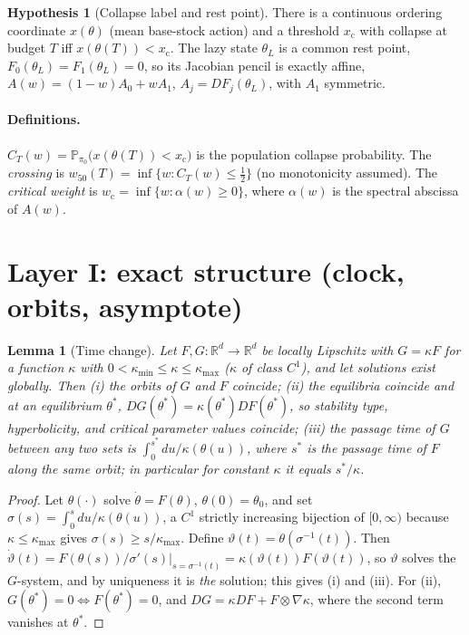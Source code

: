 \documentclass[11pt]{article}
\newtheorem{lemma}{Lemma}
\theoremstyle{definition}
\newtheorem{hyp}{Hypothesis}
\theoremstyle{remark}
\newcommand{\R}{\mathbb{R}}
\renewcommand{\P}{\mathbb{P}}
\newcommand{\wcrit}{w_{\mathrm c}}
\newcommand{\wfifty}{w_{50}}
\newcommand{\xc}{x_{\mathrm c}}
\begin{document}
\begin{hyp}[Collapse label and rest point]\label{h4}
There is a continuous ordering coordinate $x(\theta)$ (mean base-stock action) and a threshold $\xc$ with collapse at budget $T$ iff $x(\theta(T))<\xc$. The lazy state $\theta_L$ is a common rest point, $F_0(\theta_L)=F_1(\theta_L)=0$, so its Jacobian pencil is exactly affine, $A(w)=(1-w)A_0+wA_1$, $A_j=DF_j(\theta_L)$, with $A_1$ symmetric.
\end{hyp}

\paragraph{Definitions.} $C_T(w)=\P_{\pi_0}\big(x(\theta(T))<\xc\big)$ is the population collapse probability. The \emph{crossing} is $\wfifty(T)=\inf\{w:C_T(w)\le\tfrac12\}$ (no monotonicity assumed). The \emph{critical weight} is $\wcrit=\inf\{w:\alpha(w)\ge0\}$, where $\alpha(w)$ is the spectral abscissa of $A(w)$.

\section{Layer I: exact structure (clock, orbits, asymptote)}

\begin{lemma}[Time change]\label{l2}
Let $F,G:\R^d\to\R^d$ be locally Lipschitz with $G=\kappa F$ for a function $\kappa$ with $0<\kappa_{\min}\le\kappa\le\kappa_{\max}$ ($\kappa$ of class $C^1$), and let solutions exist globally. Then (i) the orbits of $G$ and $F$ coincide; (ii) the equilibria coincide and at an equilibrium $\theta^*$, $DG(\theta^*)=\kappa(\theta^*)DF(\theta^*)$, so stability type, hyperbolicity, and critical parameter values coincide; (iii) the passage time of $G$ between any two sets is $\int_0^{s^*}du/\kappa(\theta(u))$, where $s^*$ is the passage time of $F$ along the same orbit; in particular for constant $\kappa$ it equals $s^*/\kappa$.
\end{lemma}
\begin{proof}
Let $\theta(\cdot)$ solve $\dot\theta=F(\theta)$, $\theta(0)=\theta_0$, and set $\sigma(s)=\int_0^s du/\kappa(\theta(u))$, a $C^1$ strictly increasing bijection of $[0,\infty)$ because $\kappa\le\kappa_{\max}$ gives $\sigma(s)\ge s/\kappa_{\max}$. Define $\vartheta(t)=\theta(\sigma^{-1}(t))$. Then $\dot\vartheta(t)=F(\theta(s))/\sigma'(s)\big|_{s=\sigma^{-1}(t)}=\kappa(\vartheta(t))F(\vartheta(t))$, so $\vartheta$ solves the $G$-system, and by uniqueness it is \emph{the} solution; this gives (i) and (iii). For (ii), $G(\theta^*)=0\iff F(\theta^*)=0$, and $DG=\kappa DF+F\otimes\nabla\kappa$, where the second term vanishes at $\theta^*$.
\end{proof}
\end{document}
